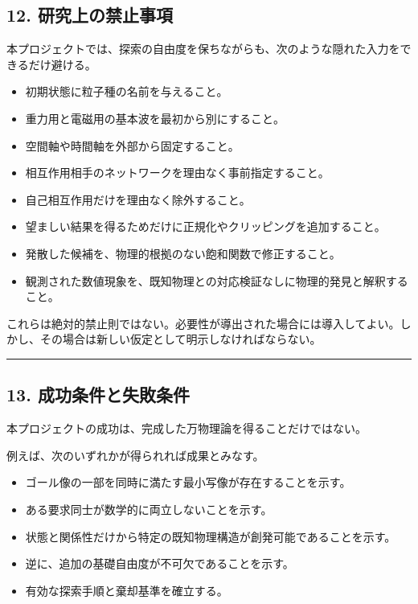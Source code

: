 \documentclass[
  a4paper,
]{ltjsarticle}
\providecommand{\tightlist}{%
  \setlength{\itemsep}{0pt}\setlength{\parskip}{0pt}}
\begin{document}
\subsection{12.
研究上の禁止事項}\label{ux7814ux7a76ux4e0aux306eux7981ux6b62ux4e8bux9805}

本プロジェクトでは、探索の自由度を保ちながらも、次のような隠れた入力をできるだけ避ける。

\begin{itemize}
\tightlist
\item
  初期状態に粒子種の名前を与えること。
\item
  重力用と電磁用の基本波を最初から別にすること。
\item
  空間軸や時間軸を外部から固定すること。
\item
  相互作用相手のネットワークを理由なく事前指定すること。
\item
  自己相互作用だけを理由なく除外すること。
\item
  望ましい結果を得るためだけに正規化やクリッピングを追加すること。
\item
  発散した候補を、物理的根拠のない飽和関数で修正すること。
\item
  観測された数値現象を、既知物理との対応検証なしに物理的発見と解釈すること。
\end{itemize}

これらは絶対的禁止則ではない。必要性が導出された場合には導入してよい。しかし、その場合は新しい仮定として明示しなければならない。

\begin{center}\rule{0.5\linewidth}{0.5pt}\end{center}

\subsection{13.
成功条件と失敗条件}\label{ux6210ux529fux6761ux4ef6ux3068ux5931ux6557ux6761ux4ef6}

本プロジェクトの成功は、完成した万物理論を得ることだけではない。

例えば、次のいずれかが得られれば成果とみなす。

\begin{itemize}
\tightlist
\item
  ゴール像の一部を同時に満たす最小写像が存在することを示す。
\item
  ある要求同士が数学的に両立しないことを示す。
\item
  状態と関係性だけから特定の既知物理構造が創発可能であることを示す。
\item
  逆に、追加の基礎自由度が不可欠であることを示す。
\item
  有効な探索手順と棄却基準を確立する。
\end{itemize}
\end{document}
